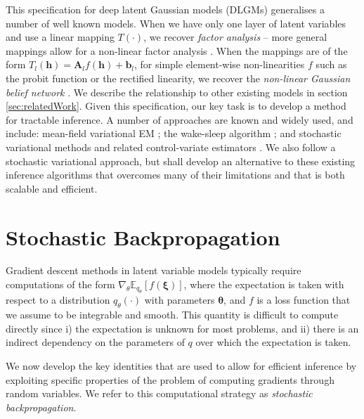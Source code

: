 \documentclass{article}
\newcommand{\hid}{\ensuremath{\mathbf{h}}} %
\newcommand{\expect}[2]{\mathbb{E}_{#1}\left[#2\right]}
\newcommand{\myvec}[1]{\mbox{$\mathbf{#1}$}}
\newcommand{\myvecsym}[1]{\mbox{$\boldsymbol{#1}$}}
\newcommand{\vtheta}{\mbox{$\myvecsym{\theta}$}}
\newcommand{\vxi}{\mbox{$\myvecsym{\xi}$}}
\newcommand{\vb}{\mbox{$\myvec{b}$}}
\newcommand{\vA}{\mbox{$\myvec{A}$}}
\begin{document}
\begin{bibunit}[icml2013]
This specification for deep latent Gaussian models (DLGMs) generalises a number 
of well known models. 
When we have only one layer of latent variables and use a linear 
mapping $T(\cdot)$, we recover \textit{factor analysis} \citep{book:bartholomew} -- more general 
mappings allow for a non-linear factor analysis \citep{lappalainen2000bayesian}. When the mappings 
are of the form $T_l(\hid) = \vA_l f(\hid) + \vb_l$, for simple element-wise 
non-linearities $f$ such as the probit function or the rectified linearity, we 
recover the \textit{non-linear Gaussian belief network} \citep{frey1999a}. We describe the relationship to other existing models in 
section \ref{sec:relatedWork}. Given this specification, our key task is to 
develop a method for tractable inference. A number of 
approaches are known and widely used, and include: mean-field variational EM \citep{beal2003}; the wake-sleep algorithm 
\citep{dayan2000}; and stochastic variational methods and related control-variate 
estimators \citep{wilson1984variance, Williams1992, hoffman2012stochastic}. We 
also follow a stochastic variational approach, but shall develop an alternative to 
these existing 
inference algorithms that overcomes many of their limitations and that is both scalable and efficient.

\vspace{-3mm}
\section{Stochastic Backpropagation}
\label{sec:stochBP}
Gradient descent methods in latent variable models typically require 
computations of the form $\nabla_\theta \expect{q_\theta}{f(\vxi)}$, where 
the expectation is taken with respect to a distribution $q_\theta(\cdot)$ with 
parameters
$\vtheta$, and $f$ is 
a loss function that we assume to be integrable and smooth. This quantity 
is difficult to compute directly since i)  the expectation is unknown for most problems, and ii) there is an indirect dependency on the parameters of $q$ over which the expectation is taken. 

We now develop the key identities that are used to allow for efficient inference by exploiting specific properties of the problem of computing gradients through random variables. We refer to this computational strategy as \textit{stochastic backpropagation}.
\vspace{-2mm}

\end{bibunit}
\end{document}
